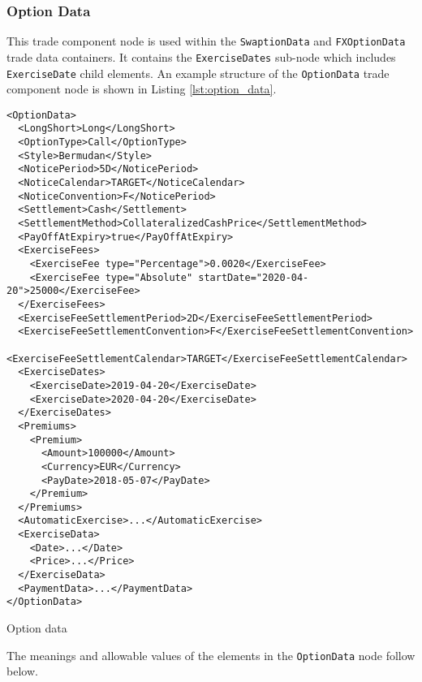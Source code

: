 \subsubsection{Option Data}
\label{ss:option_data} 
This trade component node is used within the \lstinline!SwaptionData! and \lstinline!FXOptionData! trade data
containers. It contains the \lstinline!ExerciseDates! sub-node which includes \lstinline!ExerciseDate! child
elements. An example structure of the \lstinline!OptionData! trade component node is shown in Listing
\ref{lst:option_data}.

\begin{listing}[H]
\begin{verbatim}
<OptionData>
  <LongShort>Long</LongShort>
  <OptionType>Call</OptionType>
  <Style>Bermudan</Style>
  <NoticePeriod>5D</NoticePeriod>
  <NoticeCalendar>TARGET</NoticeCalendar>
  <NoticeConvention>F</NoticePeriod>
  <Settlement>Cash</Settlement>
  <SettlementMethod>CollateralizedCashPrice</SettlementMethod>
  <PayOffAtExpiry>true</PayOffAtExpiry>
  <ExerciseFees>
    <ExerciseFee type="Percentage">0.0020</ExerciseFee>
    <ExerciseFee type="Absolute" startDate="2020-04-20">25000</ExerciseFee>
  </ExerciseFees>
  <ExerciseFeeSettlementPeriod>2D</ExerciseFeeSettlementPeriod>
  <ExerciseFeeSettlementConvention>F</ExerciseFeeSettlementConvention>
  <ExerciseFeeSettlementCalendar>TARGET</ExerciseFeeSettlementCalendar>
  <ExerciseDates>
    <ExerciseDate>2019-04-20</ExerciseDate>
    <ExerciseDate>2020-04-20</ExerciseDate>
  </ExerciseDates>
  <Premiums>
    <Premium>
      <Amount>100000</Amount>
      <Currency>EUR</Currency>
      <PayDate>2018-05-07</PayDate>
    </Premium>
  </Premiums>
  <AutomaticExercise>...</AutomaticExercise>
  <ExerciseData>
    <Date>...</Date>
    <Price>...</Price>
  </ExerciseData>
  <PaymentData>...</PaymentData>
</OptionData>
\end{verbatim}
\caption{Option data}
\label{lst:option_data}
\end{listing}

The meanings and allowable values of the elements in the \lstinline!OptionData! node follow below.

